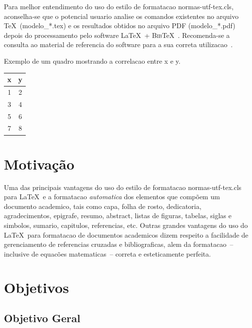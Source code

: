 \documentclass[openright]{normas-utf-tex} %
\begin{document}
Para melhor entendimento do uso do estilo de formatacao {\ttfamily normas-utf-tex.cls}, aconselha-se que o potencial usuario analise os comandos existentes no arquivo \TeX\ ({\ttfamily modelo\_*.tex}) e os resultados obtidos no arquivo PDF ({\ttfamily modelo\_*.pdf}) depois do processamento pelo software \LaTeX\ + \textsc{Bib}\TeX~\cite{LaTeX2009,BibTeX2009}. Recomenda-se a consulta ao material de referencia do software para a sua correta utilizacao~\cite{Lamport1986,Buerger1989,Kopka2003,Mittelbach2004}.

\begin{quadro}[!htb]
	\centering
	\caption[Exemplo de um quadro]{Exemplo de um quadro mostrando a correlacao entre x e y.}
	\label{tab:correlacao}
	\begin{tabular}{cc}
		\hline 
		x & y \\
		\hline
		1 & 2 \\
		3 & 4 \\
		5 & 6 \\
		7 & 8 \\
		\hline 
	\end{tabular}
\end{quadro}

\section{Motivação}

Uma das principais vantagens do uso do estilo de formatacao {\ttfamily normas-utf-tex.cls} para \LaTeX\ e a formatacao \textit{automatica} dos elementos que comp\~oem um documento academico, tais como capa, folha de rosto, dedicatoria, agradecimentos, epigrafe, resumo, abstract, listas de figuras, tabelas, siglas e simbolos, sumario, capitulos, referencias, etc. Outras grandes vantagens do uso do \LaTeX\ para formatacao de documentos academicos dizem respeito a facilidade de gerenciamento de referencias cruzadas e bibliograficas, alem da formatacao~-- inclusive de equac\~oes  matematicas~-- correta e esteticamente perfeita.

\section{Objetivos}

\subsection{Objetivo Geral}
\end{document}
